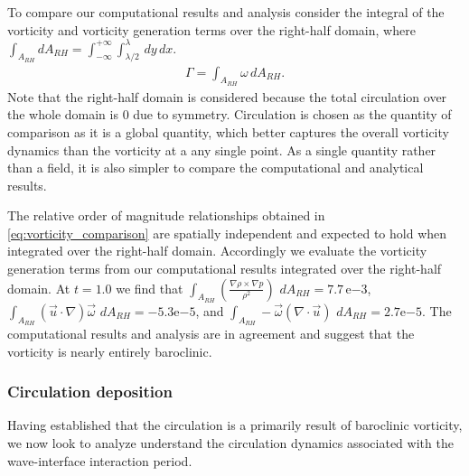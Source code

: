 To compare our computational results and analysis consider the
integral of the vorticity and vorticity generation terms over the
right-half domain, where $\int_{A_{RH}} dA_{RH} = \int_{-\infty}^{+\infty}\int_{\lambda/2}^{\lambda} \,dy\, dx$.
\begin{align}
  \Gamma = \int_{A_{RH}} \omega \,dA_{RH}.
\end{align}
Note that the right-half domain is considered because the total
circulation over the whole domain is $0$ due to symmetry. Circulation
is chosen as the quantity of comparison as it is a global quantity,
which better captures the overall vorticity dynamics than the
vorticity at a any single point. As a single quantity rather than a
field, it is also simpler to compare the computational and analytical
results.

The relative order of magnitude relationships obtained in
\eqref{eq:vorticity_comparison} are spatially independent and expected
to hold when integrated over the right-half domain. Accordingly we
evaluate the vorticity generation terms from our computational results
integrated over the right-half domain. At $t=1.0$ we find that %
$ \int_{A_{RH}}  \left(\frac{\nabla\rho\times\nabla p}{\rho^2}\right) \,\,dA_{RH}=  7.7\,\text{e}{-3}$, %
$ \int_{A_{RH}}  \left(\vec{u}\cdot\nabla\right)\vec{\omega}\,\,dA_{RH}        = -5.3\text{e}{-5}$, and %
$ \int_{A_{RH}} -\vec{\omega}\left(\nabla\cdot\vec{u}\right)\,\,dA_{RH}        =  2.7\text{e}{-5}$.%
The computational results and analysis are in agreement and suggest
that the vorticity is nearly entirely baroclinic.
% 
% 
\subsubsection{Circulation deposition}
Having established that the circulation is a primarily result of
baroclinic vorticity, we now look to analyze understand the
circulation dynamics associated with the wave-interface interaction
period.

